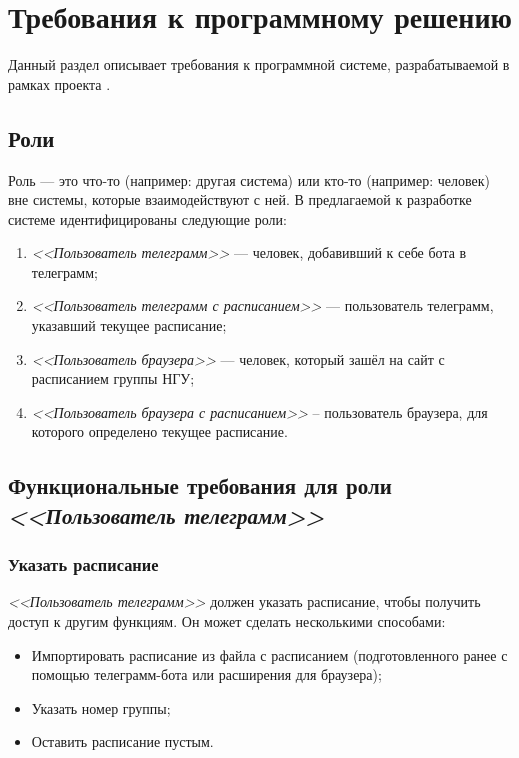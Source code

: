 \newcommand{\actor}[1]{\textit{<<#1>>}}

\chapter{Требования к программному решению}
	\label{chapter3}

	Данный раздел описывает требования к программной системе, разрабатываемой в рамках проекта \ProjectName.
		
	\section{Роли}
		Роль --- это что-то (например: другая система) или кто-то (например: человек) вне системы, которые взаимодействуют с ней. В предлагаемой к разработке системе идентифицированы следующие роли:
		\begin{enumerate}
			\item \actor{Пользователь телеграмм} --- человек, добавивший к себе бота в телеграмм;
			
			\item \actor{Пользователь телеграмм с расписанием} --- пользователь телеграмм, указавший текущее расписание;
			
			\item \actor{Пользователь браузера} --- человек, который зашёл на сайт с расписанием группы НГУ;
			
			\item \actor{Пользователь браузера с расписанием} -- пользователь браузера, для которого определено текущее расписание.
		\end{enumerate}
	
	    \begin{figure}[h!]
	    	\centering
	    	\def\svgwidth{\columnwidth}
	    	
	    \end{figure}
	
		\begin{figure}[h!]
			\centering
			\def\svgwidth{\columnwidth}
			
		\end{figure}
	\section{Функциональные требования для роли \actor{Пользователь телеграмм}}
		\subsection{Указать расписание}
			\actor{Пользователь телеграмм} должен указать расписание, чтобы получить доступ к другим функциям. Он может сделать несколькими способами:
			\begin{itemize}
				\item Импортировать расписание из файла с расписанием (подготовленного ранее с помощью телеграмм-бота или расширения для браузера);
				
				\item Указать номер группы;
				
				\item Оставить расписание пустым.
			\end{itemize}
